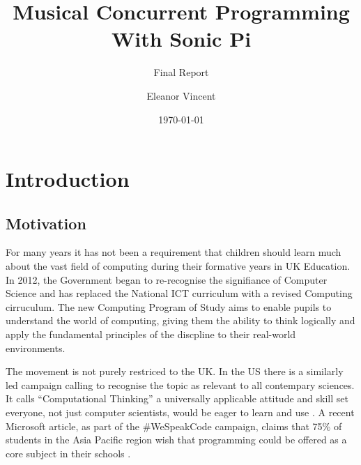 \documentclass[11pt, abstracton, twoside]{scrartcl}
\begin{document}
\title{Musical Concurrent Programming \\ With Sonic Pi}
\subtitle{Final Report}
\author{Eleanor Vincent}
\date{\today}
\maketitle{\thispagestyle{empty}}
\afterpage{\thispagestyle{empty}\null\newpage}
\newpage

\thispagestyle{empty}
\begin{abstract}
\noindent\lipsum[1]
\end{abstract}
\afterpage{\thispagestyle{empty}\null\newpage}
\newpage

\renewcommand{\abstractname}{Acknowledgements}

\thispagestyle{empty}
\begin{abstract}
\noindent\lipsum[1]
\end{abstract}
\afterpage{\thispagestyle{empty}\null\newpage}
\newpage

\thispagestyle{empty}
\tableofcontents
\newpage

\section{Introduction}
\thispagestyle{empty}

\subsection{Motivation}
For many years it has not been a requirement that children should learn much
about the vast field of computing during their formative years in UK 
Education. In 2012, the Government began to re-recognise the signifiance of 
Computer Science and has replaced the National ICT curriculum with a revised 
Computing cirruculum. The new Computing Program of Study \cite{DfE13} aims to 
enable pupils to understand the world of computing, giving them the ability to 
think logically and apply the fundamental principles of the discpline to their 
real-world environments.

The movement is not purely restriced to the UK. In the US there is a similarly 
led campaign calling to recognise the topic as relevant to all contempary 
sciences. It calls ``Computational Thinking'' a universally applicable 
attitude and skill set everyone, not just computer scientists, would be eager 
to learn and use \cite{Wing06}. A recent Microsoft article, as part of the 
\#WeSpeakCode campaign, claims that 75\% of students in the Asia Pacific region
wish that programming could be offered as a core subject in their schools \cite{micro}.
\end{document}
